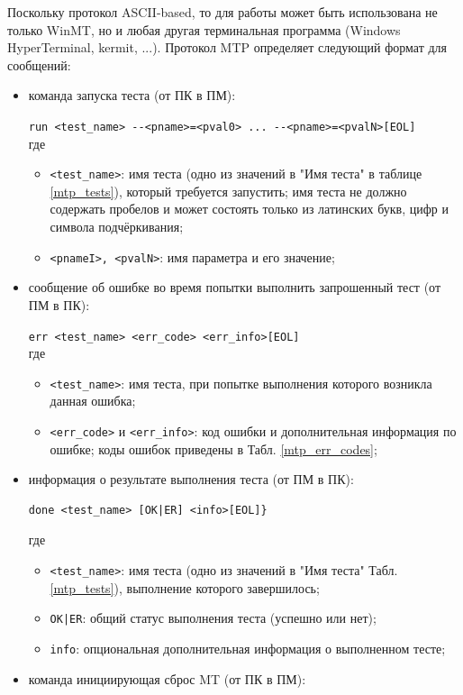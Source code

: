 \documentclass[a4paper,14pt,bachelor]{disser}
\begin{document}
Поскольку протокол ASCII-based, то для работы может быть использована не только WinMT, но и любая другая терминальная программа (Windows HyperTerminal, kermit, ...). Протокол MTP определяет следующий формат для сообщений:
\begin{itemize}
\item команда запуска теста (от ПК в ПМ):

	\verb|run <test_name> --<pname>=<pval0> ... --<pname>=<pvalN>[EOL]|\\
	где

	\begin{itemize}
		\item \verb|<test_name>|: имя теста (одно из значений в "Имя теста" в таблице \ref{mtp_tests}), который требуется запустить; имя теста не должно содержать пробелов и может состоять только из латинских букв, цифр и символа подчёркивания;
		\item \verb|<pnameI>, <pvalN>|: имя параметра и его значение;
	\end{itemize}

\item сообщение об ошибке во время попытки выполнить запрошенный тест (от ПМ в ПК):

	\verb|err <test_name> <err_code> <err_info>[EOL]|\\
	где
	\begin{itemize}
		\item \verb|<test_name>|: имя теста, при попытке выполнения которого возникла данная ошибка;
		\item \verb|<err_code>| и \verb|<err_info>|: код ошибки и дополнительная информация по ошибке; коды ошибок приведены в Табл. \ref{mtp_err_codes};
	\end{itemize}

\item информация о результате выполнения теста (от ПМ в ПК):
	
	\begin{verbatim}done <test_name> [OK|ER] <info>[EOL]}\end{verbatim}
	где
	\begin{itemize}
		\item \verb|<test_name>|: имя теста (одно из значений в "Имя теста" Табл.\ref{mtp_tests}), выполнение которого завершилось;
		\item \texttt{OK|ER}: общий статус выполнения теста (успешно или нет);
		\item \verb|info|: опциональная дополнительная информация о выполненном тесте;
	\end{itemize}
\item команда инициирующая сброс MT (от ПК в ПМ):


\end{itemize}
\end{document}
